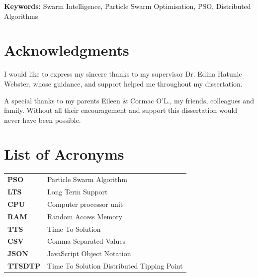 \documentclass[oneside,12pt]{book}
\begin{document}
\vfill
\noindent
\textbf{Keywords:} \quad Swarm Intelligence, Particle Swarm Optimisation, PSO, Distributed Algorithms

\chapter*{Acknowledgments}

I would like to express my sincere thanks to my supervisor Dr. Edina Hatunic Webster, whose guidance, and support helped me throughout my dissertation. 

\vspace{5mm}

{\setlength{\parindent}{0cm}A special thanks to my parents Eileen \& Cormac O'L., my friends, colleagues and family. Without all their encouragement and support this dissertation would never have been possible.}

\newpage
\tableofcontents

\listoffigures

\listoftables

\lstlistoflistings

\chapter*{List of Acronyms}
\begin{table}[H]
  \centering
    \begin{tabular}{ l l }
    \textbf{PSO} & Particle Swarm Algorithm \\
    \textbf{LTS} & Long Term Support \\
    \textbf{CPU} & Computer processor unit \\
    \textbf{RAM} & Random Access Memory \\
    \textbf{TTS} & Time To Solution \\
    \textbf{CSV} & Comma Separated Values \\
    \textbf{JSON} & JavaScript Object Notation \\
    \textbf{TTSDTP} & Time To Solution Distributed Tipping Point \\
    \end{tabular}
\end{table}

\newpage

\fancyhead[RE,LO]{\leftmark}
\renewcommand{\headrulewidth}{2pt}
\end{document}
